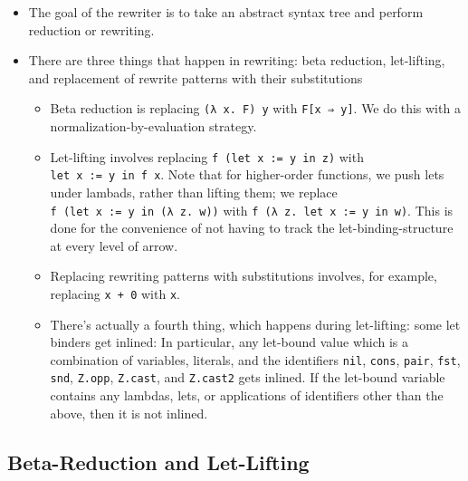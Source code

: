 \begin{itemize}
\tightlist
\item
  The goal of the rewriter is to take an abstract syntax tree and
  perform reduction or rewriting.
\item
  There are three things that happen in rewriting: beta reduction,
  let-lifting, and replacement of rewrite patterns with their
  substitutions

  \begin{itemize}
  \tightlist
  \item
    Beta reduction is replacing \texttt{(λ\ x.\ F)\ y} with
    \texttt{F{[}x\ ⇒\ y{]}}. We do this with a
    normalization-by-evaluation strategy.
  \item
    Let-lifting involves replacing \texttt{f\ (let\ x\ :=\ y\ in\ z)}
    with \texttt{let\ x\ :=\ y\ in\ f\ x}. Note that for higher-order
    functions, we push lets under lambads, rather than lifting them; we
    replace \texttt{f\ (let\ x\ :=\ y\ in\ (λ\ z.\ w))} with
    \texttt{f\ (λ\ z.\ let\ x\ :=\ y\ in\ w)}. This is done for the
    convenience of not having to track the let-binding-structure at
    every level of arrow.
  \item
    Replacing rewriting patterns with substitutions involves, for
    example, replacing \texttt{x\ +\ 0} with \texttt{x}.
  \item
    There's actually a fourth thing, which happens during let-lifting:
    some let binders get inlined: In particular, any let-bound value
    which is a combination of variables, literals, and the identifiers
    \texttt{nil}, \texttt{cons}, \texttt{pair}, \texttt{fst},
    \texttt{snd}, \texttt{Z.opp}, \texttt{Z.cast}, and \texttt{Z.cast2}
    gets inlined. If the let-bound variable contains any lambdas, lets,
    or applications of identifiers other than the above, then it is not
    inlined.
  \end{itemize}
\end{itemize}

\hypertarget{beta-reduction-and-let-lifting}{%
\subsection{Beta-Reduction and
Let-Lifting}\label{beta-reduction-and-let-lifting}}

